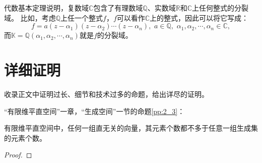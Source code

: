 \documentclass[12pt,UTF8]{ctexbook}
\begin{document}
\begin{appendix}
代数基本定理说明，复数域$\mathbb{C}$包含了有理数域$\mathbb{Q}$、实数域$\mathbb{R}$和$\mathbb{C}$上任何整式的分裂域。
比如，考虑$\mathbb{Q}$上任一个整式$f$，$f$可以看作$\mathbb{C}$上的整式，因此可以将它写成：
$$ f = a(z - \alpha_1)(z - \alpha_2)\cdots(z - \alpha_n), \,\, a \in \mathbb{Q}, \,\, \alpha_1, \alpha_2, \cdots ,  \alpha_n \in \mathbb{C}, $$
而$\mathbb{K} = \mathbb{Q}(\alpha_1, \alpha_2, \cdots , \alpha_n)$就是$f$的分裂域。

\chapter{详细证明}

收录正文中证明过长、细节和技术过多的命题，给出详尽的证明。

“有限维平直空间”一章，“生成空间”一节的命题\ref{pp:2_3}：
\begin{pp}\label{c-10}
    有限维平直空间中，任何一组直无关的向量，其元素个数都不多于任意一组生成集的元素个数。
\end{pp}
\begin{proof} %


\end{proof}
\end{appendix}
\end{document}
